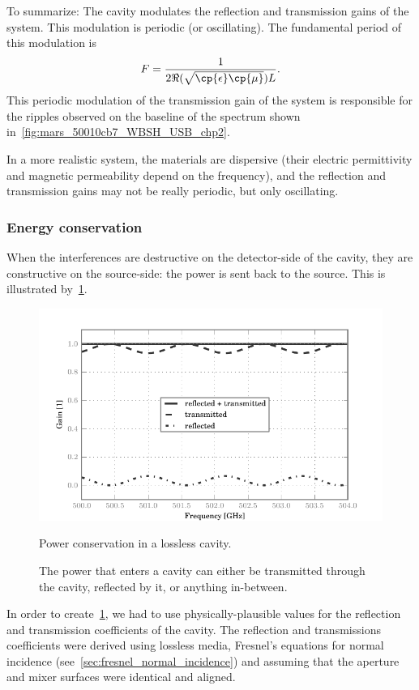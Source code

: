 \begin{refsection}
To summarize:
The cavity modulates the reflection and transmission gains of the system.
This modulation is periodic (or oscillating).
The fundamental period of this modulation is
\begin{equation}
    F = 
    \frac{1}{2\Re(\sqrt{\cp{\epsilon}\cp{\mu}})L}
    \text{.}
    \label{eq:relation_length_period_nice}
\end{equation}
This periodic modulation of the transmission gain of the system is responsible for the ripples observed on the baseline of the spectrum shown in~\cref{fig:mars_50010cb7_WBSH_USB_chp2}.

In a more realistic system, the materials are dispersive (their electric permittivity and magnetic permeability depend on the frequency), and the reflection and transmission gains may not be really periodic, but only oscillating.




\subsubsection{Energy conservation}

When the interferences are destructive on the detector-side of the cavity, they are constructive on the source-side: the power is sent back to the source.
This is illustrated by~\cref{fig:cavity_energy_conservation}.
\begin{figure}
    \centering
    \includegraphics{cavity_energy_conservation}
    \caption{Power conservation in a lossless cavity.}
    \caption*{
        The power that enters a cavity can either be transmitted through the cavity, reflected by it, or anything in-between.
    }
    \label{fig:cavity_energy_conservation}
\end{figure}
In order to create~\cref{fig:cavity_energy_conservation}, we had to use physically-plausible values for the reflection and transmission coefficients of the cavity.
The reflection and transmissions coefficients were derived using lossless media, Fresnel's equations for normal incidence (see~\vref{sec:fresnel_normal_incidence})
and assuming that the aperture and mixer surfaces were identical and aligned.


\end{refsection}
